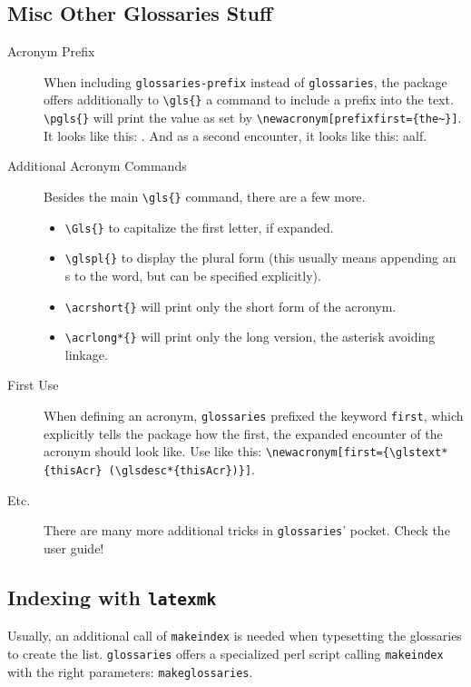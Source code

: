 \subsection{Misc Other Glossaries Stuff} %
\label{sub:misc_other_glossaries_stuff}
\begin{description}
	\item[Acronym Prefix] When including \texttt{glossaries-prefix} instead of \texttt{glossaries}, the package offers additionally to \verb|\gls{}| a command to include a prefix into the text. \verb|\pgls{}| will print the value as set by \verb|\newacronym[prefixfirst={the~}]|. It looks like this: . And as a second encounter, it looks like this: \gls{aalf}.
	\item[Additional Acronym Commands] Besides the main \verb|\gls{}| command, there are a few more.
	\begin{itemize}
	 	\item \verb|\Gls{}| to capitalize the first letter, if expanded.
	 	\item \verb|\glspl{}| to display the plural form (this usually means appending an s to the word, but can be specified explicitly).
	 	\item \verb|\acrshort{}| will print only the short form of the acronym.
	 	\item \verb|\acrlong*{}| will print only the long version, the asterisk avoiding linkage.
	 \end{itemize}
	 \item[First Use] When defining an acronym, \texttt{glossaries} prefixed the keyword \texttt{first}, which explicitly tells the package how the first, the expanded encounter of the acronym should look like. Use like this: \verb|\newacronym[first={\glstext*{thisAcr} (\glsdesc*{thisAcr})}]|.
	 \item[Etc.] There are many more additional tricks in \texttt{glossaries}' pocket. Check the user guide!
\end{description}
\subsection{Indexing with \texttt{latexmk}} %
\label{sub:indexing_with_latexmk}
Usually, an additional call of \texttt{makeindex} is needed when typesetting the glossaries to create the list. \texttt{glossaries}	offers a specialized perl script calling \texttt{makeindex} with the right parameters: \texttt{makeglossaries}.

